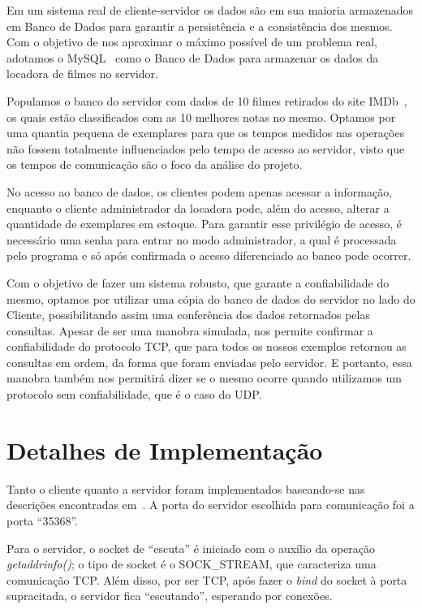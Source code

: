 \documentclass[12pt,a4paper]{article}
\begin{document}
Em um sistema real de cliente-servidor os dados são em sua maioria armazenados em Banco de Dados para garantir a persistência e a consistência dos mesmos. Com o objetivo de nos aproximar o máximo possível de um problema real, adotamos o MySQL~\cite{mysql1995mysql} como o Banco de Dados para armazenar os dados da locadora de filmes no servidor.

    Populamos o banco do servidor com dados de 10 filmes retirados do site IMDb~\cite{IMDbsite}, os quais estão classificados com as 10 melhores notas no mesmo. Optamos por uma quantia pequena de exemplares para que os tempos medidos nas operações não fossem totalmente influenciados pelo tempo de acesso ao servidor, visto que os tempos de comunicação são o foco da análise do projeto.
    
    No acesso ao banco de dados, os clientes podem apenas acessar a informação, enquanto o cliente administrador da locadora pode, além do acesso, alterar a quantidade de exemplares em estoque. Para garantir esse privilégio de acesso, é necessário uma senha para entrar no modo administrador, a qual é processada pelo programa e só após confirmada o acesso diferenciado ao banco pode ocorrer.
    
Com o objetivo de fazer um sistema robusto, que garante a confiabilidade do mesmo, optamos por utilizar uma cópia do banco de dados do servidor no lado do Cliente, possibilitando assim uma conferência dos dados retornados pelas consultas. Apesar de ser uma manobra simulada, nos permite confirmar a confiabilidade do protocolo TCP, que para todos os nossos exemplos retornou as consultas em ordem, da forma que foram enviadas pelo servidor. E portanto, essa manobra também nos permitirá dizer se o mesmo ocorre quando utilizamos um protocolo sem confiabilidade, que é o caso do UDP.

\section{Detalhes de Implementação}

Tanto o cliente quanto a servidor foram implementados baseando-se nas descrições encontradas em~\cite{hall19beej}. A porta do servidor escolhida para comunicação foi a porta “35368”.

Para o servidor, o socket de “escuta” é iniciado com o auxílio da operação {\it getaddrinfo()}; o tipo de socket é o SOCK\_STREAM, que caracteriza uma comunicação TCP. Além disso, por ser TCP, após fazer o {\it bind} do socket à porta supracitada, o servidor fica “escutando”, esperando por conexões.
\end{document}
